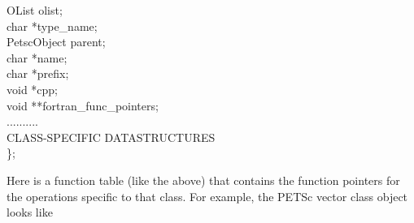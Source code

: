 \documentclass[twoside,12pt]{../sty/report_petsc}
\begin{document}
\begin{tabbing}
  OList            olist;                                   \\
  char             *type\_name;                              \\
  PetscObject      parent;                                  \\
  char             *name;                                    \\
  char             *prefix;                                 \\
  void             *cpp;\\
  void             **fortran\_func\_pointers;       \\
  ..........\\
  CLASS-SPECIFIC DATASTRUCTURES\\
\};
\end{tabbing}
Here  is a function table (like the  above) that
contains the function pointers for the operations specific to that class.
For example, the PETSc vector class object looks like
\end{document}

